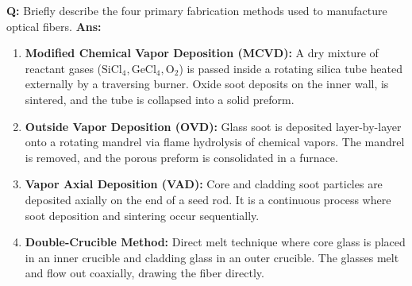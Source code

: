 \documentclass[10pt,a4paper,twocolumn]{article}
\begin{document}
\begin{tcolorbox}[
  colback=white,
  colframe=UnitColorThree,
  colbacktitle=gray!10!white,
  coltitle=black,
  fonttitle=\bfseries\sffamily\small,
  title={Unit III $\bullet$ Card 7: Fiber Fabrication Methods},
  boxrule=1.2pt,
  arc=2mm,
  outer arc=2mm,
  boxsep=1.5mm,
  top=1mm,
  bottom=1mm,
  left=1.5mm,
  right=1.5mm,
  before skip=2.5mm,
  after skip=2.5mm
]
\textbf{Q:} Briefly describe the four primary fabrication methods used to manufacture optical fibers.
\tcbline
\textbf{Ans:} \begin{enumerate}
  \item \textbf{Modified Chemical Vapor Deposition (MCVD):} A dry mixture of reactant gases ($\text{SiCl}_4, \text{GeCl}_4, \text{O}_2$) is passed inside a rotating silica tube heated externally by a traversing burner. Oxide soot deposits on the inner wall, is sintered, and the tube is collapsed into a solid preform.
  \item \textbf{Outside Vapor Deposition (OVD):} Glass soot is deposited layer-by-layer onto a rotating mandrel via flame hydrolysis of chemical vapors. The mandrel is removed, and the porous preform is consolidated in a furnace.
  \item \textbf{Vapor Axial Deposition (VAD):} Core and cladding soot particles are deposited axially on the end of a seed rod. It is a continuous process where soot deposition and sintering occur sequentially.
  \item \textbf{Double-Crucible Method:} Direct melt technique where core glass is placed in an inner crucible and cladding glass in an outer crucible. The glasses melt and flow out coaxially, drawing the fiber directly.
\end{enumerate}
\end{tcolorbox}
\end{document}

